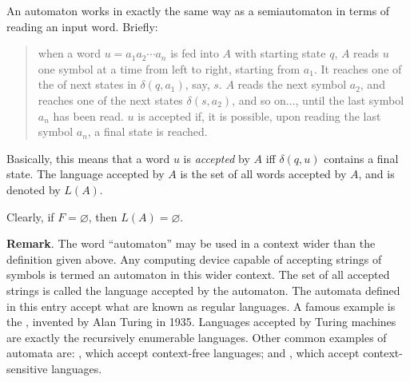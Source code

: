 \documentclass[12pt]{article}
\begin{document}
An automaton works in exactly the same way as a semiautomaton in terms of reading an input word.  Briefly: 
\begin{quote}
when a word $u=a_1a_2 \cdots a_n$ is fed into $A$ with starting state $q$, $A$ reads $u$ one symbol at a time from left to right, starting from $a_1$.  It reaches one of the of next states in $\delta(q,a_1)$, say, $s$.  $A$ reads the next symbol $a_2$, and reaches one of the next states $\delta(s,a_2)$, and so on..., until the last symbol $a_n$ has been read.  $u$ is accepted if, it is possible, upon reading the last symbol $a_n$, a final state is reached.
\end{quote}
Basically, this means that a word $u$ is \emph{accepted} by $A$ iff $\delta(q,u)$ contains a final state.  The language accepted by $A$ is the set of all words accepted by $A$, and is denoted by $L(A)$.

Clearly, if $F=\varnothing$, then $L(A)=\varnothing$.


\textbf{Remark}.  The word ``automaton'' may be used in a context wider than the definition given above.  Any computing device capable of accepting strings of symbols is termed an automaton in this wider context.  The set of all accepted strings is called the language accepted by the automaton.  The automata defined in this entry accept what are known as regular languages.  A famous example is the , invented by Alan Turing in 1935.  Languages accepted by Turing machines are exactly the recursively enumerable languages.  Other common examples of automata are: , which accept context-free languages; and , which accept context-sensitive languages.



\end{document}
